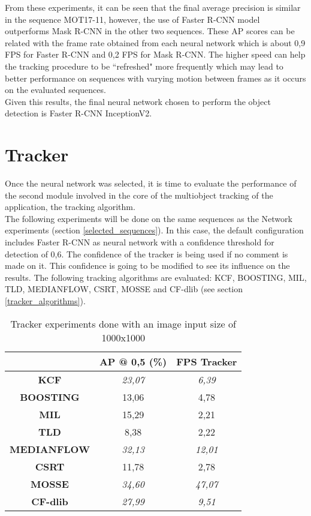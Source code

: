 From these experiments, it can be seen that the final average precision is similar in the sequence MOT17-11, however, the use of Faster R-CNN model outperforms Mask R-CNN in the other two sequences. These AP scores can be related with the frame rate obtained from each neural network which is about 0,9 FPS for Faster R-CNN and 0,2 FPS for Mask R-CNN. The higher speed can help the tracking procedure to be ``refreshed" more frequently which may lead to better performance on sequences with varying motion between frames as it occurs on the evaluated sequences.\\
Given this results, the final neural network chosen to perform the object detection is Faster R-CNN InceptionV2.
\section{Tracker}
Once the neural network was selected, it is time to evaluate the performance of the second module involved in the core of the multiobject tracking of the application, the tracking algorithm.\\
The following experiments will be done on the same sequences as the Network experiments (section \ref{selected_sequences}). In this case, the default configuration includes Faster R-CNN as neural network with a confidence threshold for detection of 0,6. The confidence of the tracker is being used if no comment is made on it. This confidence is going to be modified to see its influence on the results. The following tracking algorithms are evaluated: KCF, BOOSTING, MIL, TLD, MEDIANFLOW, CSRT, MOSSE and CF-dlib (see section \ref{tracker_algorithms}).\\
\begin{table}[H]
\begin{center}
\begin{tabular}{|c|c|c|}
\hline
\textbf{}           & \textbf{AP @ 0,5 (\%)} & \textbf{FPS Tracker} \\ \hline
\textbf{KCF}        & \textit{23,07}         & \textit{6,39}        \\ \hline
\textbf{BOOSTING}   & 13,06                  & 4,78                 \\ \hline
\textbf{MIL}        & 15,29                  & 2,21                 \\ \hline
\textbf{TLD}        & 8,38                   & 2,22                 \\ \hline
\textbf{MEDIANFLOW} & \textit{32,13}         & \textit{12,01}       \\ \hline
\textbf{CSRT}       & 11,78                  & 2,78                 \\ \hline
\textbf{MOSSE}      & \textit{34,60}         & \textit{47,07}       \\ \hline
\textbf{CF-dlib}    & \textit{27,99}         & \textit{9,51}        \\ \hline
\end{tabular}
\end{center}
\caption{Tracker experiments done with an image input size of 1000x1000}
\label{tab:tracker_exp_1}
\end{table}
